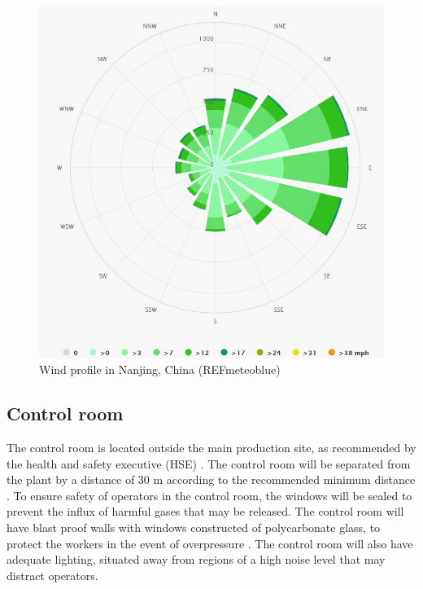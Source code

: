 \begin{figure}
\centering
\includegraphics[width=\linewidth]{figures/Windrose_profile.jpg}
\caption{Wind profile in Nanjing, China (REFmeteoblue)}
\label{fig:wind}
\end{figure}

\subsection{Control room}

The control room is located outside the main production site, as recommended by the health and safety executive (HSE) \cite{health_and_safety_executive_control_nodate}. The control room will be separated from the plant by a distance of 30 m according to the recommended minimum distance \cite{mannan_lees_2012}. To ensure safety of operators in the control room, the windows will be sealed to prevent the influx of harmful gases that may be released. The control room will have blast proof walls with windows constructed of polycarbonate glass, to protect the workers in the event of overpressure \cite{health_and_safety_executive_control_nodate}. The control room will also have adequate lighting, situated away from regions of a high noise level that may distract operators.

